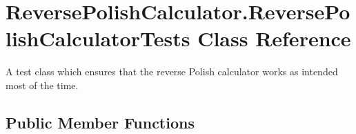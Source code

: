 \hypertarget{class_reverse_polish_calculator_1_1_reverse_polish_calculator_tests}{\section{Reverse\+Polish\+Calculator.\+Reverse\+Polish\+Calculator\+Tests Class Reference}
\label{class_reverse_polish_calculator_1_1_reverse_polish_calculator_tests}
}


A test class which ensures that the reverse Polish calculator works as intended most of the time.  


\subsection*{Public Member Functions}
